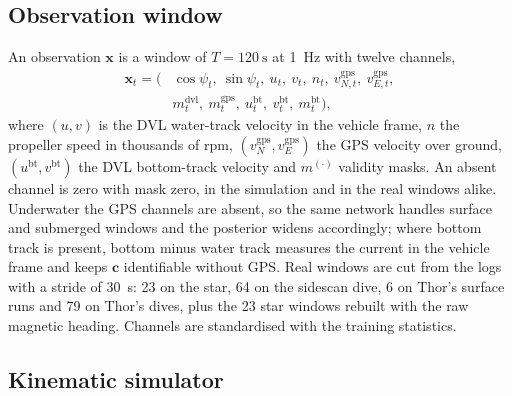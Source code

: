 \documentclass[conference]{IEEEtran}
\newcommand{\vect}[1]{\boldsymbol{#1}}
\newcommand{\bx}{\vect{x}}
\begin{document}
\subsection{Observation window}

An observation $\bx$ is a window of $T=\SI{120}{\second}$ at \SI{1}{\hertz} with twelve channels,
\begin{equation}
\begin{aligned}
\bx_t = \big(&\cos\psi_t,\ \sin\psi_t,\ u_t,\ v_t,\ n_t,\ v^{\mathrm{gps}}_{N,t},\ v^{\mathrm{gps}}_{E,t},\\
&m^{\mathrm{dvl}}_t,\ m^{\mathrm{gps}}_t,\ u^{\mathrm{bt}}_t,\ v^{\mathrm{bt}}_t,\ m^{\mathrm{bt}}_t\big),
\end{aligned}
\end{equation}
where $(u,v)$ is the DVL water-track velocity in the vehicle frame, $n$ the propeller speed in thousands of rpm, $(v^{\mathrm{gps}}_N, v^{\mathrm{gps}}_E)$ the GPS velocity over ground, $(u^{\mathrm{bt}}, v^{\mathrm{bt}})$ the DVL bottom-track velocity and $m^{(\cdot)}$ validity masks. An absent channel is zero with mask zero, in the simulation and in the real windows alike. Underwater the GPS channels are absent, so the same network handles surface and submerged windows and the posterior widens accordingly; where bottom track is present, bottom minus water track measures the current in the vehicle frame and keeps $\vect{c}$ identifiable without GPS. Real windows are cut from the logs with a stride of \SI{30}{\second}: 23 on the star, 64 on the sidescan dive, 6 on Thor's surface runs and 79 on Thor's dives, plus the 23 star windows rebuilt with the raw magnetic heading. Channels are standardised with the training statistics.

\subsection{Kinematic simulator}
\end{document}
